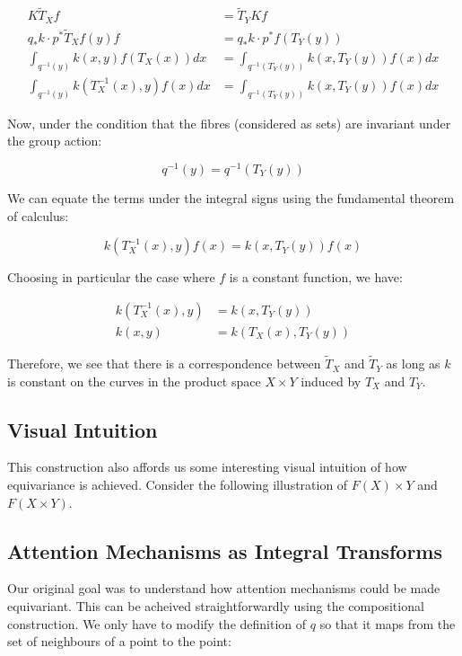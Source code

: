 \documentclass[11pt]{article}
\begin{document}
\begin{align*}
  K \tilde{T}_X f &= \tilde{T}_Y K f \\
  q_* k \cdot p^*\tilde{T}_X f (y) f &= q_* k \cdot p^* f (T_Y(y)) \\
  \int_{q^{-1}(y)} k(x, y) f(T_X(x)) dx &= \int_{q^{-1}(T_Y(y))} k(x, T_Y(y)) f(x) dx \\
  \int_{q^{-1}(y)} k(T_X^{-1}(x), y) f(x) dx &= \int_{q^{-1}(T_Y(y))} k(x, T_Y(y)) f(x) dx 
\end{align*}


Now, under the condition that the fibres (considered as sets) are invariant under the group action:

$$ q^{-1}(y) = q^{-1}(T_Y(y)) $$

We can equate the terms under the integral signs using the fundamental theorem of calculus:

$$ k(T^{-1}_X(x), y) f(x) = k(x, T_Y(y)) f(x)  $$

Choosing in particular the case where $f$ is a constant function, we have:

\begin{align*}
	k(T^{-1}_X(x), y) &= k(x, T_Y(y)) \\
	k(x, y) &= k(T_X(x), T_Y(y))
\end{align*}

Therefore, we see that there is a correspondence between $\tilde{T}_X$ and $\tilde{T}_Y$ as long as $k$ is constant on the curves in the product space $X \times Y$ induced by $T_X$ and $T_Y$. 

\subsection*{Visual Intuition}

This construction also affords us some interesting visual intuition of how equivariance is achieved. Consider the following illustration of $F(X) \times Y$ and $F(X \times Y)$.

\subsection*{Attention Mechanisms as Integral Transforms}

Our original goal was to understand how attention mechanisms could be made equivariant. This can be acheived straightforwardly using the compositional construction. We only have to modify the definition of $q$ so that it maps from the set of neighbours of a point to the point:
\end{document}
